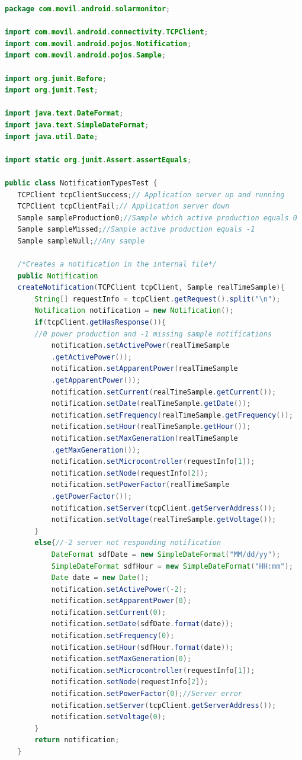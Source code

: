 \begin{lstlisting}[language= Java, frame=single]
package com.movil.android.solarmonitor;

import com.movil.android.connectivity.TCPClient;
import com.movil.android.pojos.Notification;
import com.movil.android.pojos.Sample;

import org.junit.Before;
import org.junit.Test;

import java.text.DateFormat;
import java.text.SimpleDateFormat;
import java.util.Date;

import static org.junit.Assert.assertEquals;

public class NotificationTypesTest {
   TCPClient tcpClientSuccess;// Application server up and running
   TCPClient tcpClientFail;// Application server down
   Sample sampleProduction0;//Sample which active production equals 0
   Sample sampleMissed;//Sample active production equals -1
   Sample sampleNull;//Any sample

   /*Creates a notification in the internal file*/
   public Notification
   createNotification(TCPClient tcpClient, Sample realTimeSample){
       String[] requestInfo = tcpClient.getRequest().split("\n");
       Notification notification = new Notification();
       if(tcpClient.getHasResponse()){
       //0 power production and -1 missing sample notifications
           notification.setActivePower(realTimeSample
           .getActivePower());
           notification.setApparentPower(realTimeSample
           .getApparentPower());
           notification.setCurrent(realTimeSample.getCurrent());
           notification.setDate(realTimeSample.getDate());
           notification.setFrequency(realTimeSample.getFrequency());
           notification.setHour(realTimeSample.getHour());
           notification.setMaxGeneration(realTimeSample
           .getMaxGeneration());
           notification.setMicrocontroller(requestInfo[1]);
           notification.setNode(requestInfo[2]);
           notification.setPowerFactor(realTimeSample
           .getPowerFactor());
           notification.setServer(tcpClient.getServerAddress());
           notification.setVoltage(realTimeSample.getVoltage());
       }
       else{//-2 server not responding notification
           DateFormat sdfDate = new SimpleDateFormat("MM/dd/yy");
           SimpleDateFormat sdfHour = new SimpleDateFormat("HH:mm");
           Date date = new Date();
           notification.setActivePower(-2);
           notification.setApparentPower(0);
           notification.setCurrent(0);
           notification.setDate(sdfDate.format(date));
           notification.setFrequency(0);
           notification.setHour(sdfHour.format(date));
           notification.setMaxGeneration(0);
           notification.setMicrocontroller(requestInfo[1]);
           notification.setNode(requestInfo[2]);
           notification.setPowerFactor(0);//Server error
           notification.setServer(tcpClient.getServerAddress());
           notification.setVoltage(0);
       }
       return notification;
   }


\end{lstlisting}
